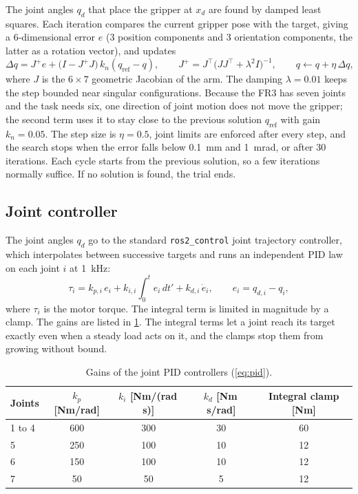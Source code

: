 \documentclass[11pt,a4paper]{article}
\begin{document}
The joint angles $q_d$ that place the gripper at $x_d$ are found by damped least squares. Each
iteration compares the current gripper pose with the target, giving a 6-dimensional error $e$
(3 position components and 3 orientation components, the latter as a rotation vector), and updates
\begin{equation}\label{eq:ik}
  \Delta q = J^{+} e + \bigl(I - J^{+} J\bigr)\, k_n (q_{\mathrm{ref}} - q), \qquad
  J^{+} = J^{\top}\bigl(J J^{\top} + \lambda^{2} I\bigr)^{-1}, \qquad
  q \leftarrow q + \eta\, \Delta q ,
\end{equation}
where $J$ is the $6 \times 7$ geometric Jacobian of the arm. The damping $\lambda = 0.01$ keeps
the step bounded near singular configurations. Because the FR3 has seven joints and the task needs
six, one direction of joint motion does not move the gripper; the second term uses it to stay close
to the previous solution $q_{\mathrm{ref}}$ with gain $k_n = 0.05$. The step size is $\eta = 0.5$,
joint limits are enforced after every step, and the search stops when the error falls below
0.1~mm and 1~mrad, or after 30 iterations. Each cycle starts from the previous solution, so a few
iterations normally suffice. If no solution is found, the trial ends.

\subsection{Joint controller}

The joint angles $q_d$ go to the standard \texttt{ros2\_control} joint trajectory controller, which
interpolates between successive targets and runs an independent PID law on each joint $i$ at
1~kHz:
\begin{equation}\label{eq:pid}
  \tau_i = k_{p,i}\, e_i + k_{i,i} \int_0^t e_i \, dt' + k_{d,i}\, \dot e_i ,
  \qquad e_i = q_{d,i} - q_i ,
\end{equation}
where $\tau_i$ is the motor torque. The integral term is limited in magnitude by a clamp. The gains
are listed in \cref{tab:gains}. The integral terms let a joint reach its target exactly even when a
steady load acts on it, and the clamps stop them from growing without bound.

\begin{table}[ht]
\centering
\caption{Gains of the joint PID controllers (\cref{eq:pid}).}\label{tab:gains}
\begin{tabular}{lcccc}
\toprule
Joints & $k_p$ [Nm/rad] & $k_i$ [Nm/(rad\,s)] & $k_d$ [Nm\,s/rad] & Integral clamp [Nm] \\
\midrule
1 to 4 & 600 & 300 & 30 & 60 \\
5 & 250 & 100 & 10 & 12 \\
6 & 150 & 100 & 10 & 12 \\
7 & 50 & 50 & 5 & 12 \\
\bottomrule
\end{tabular}
\end{table}
\end{document}
